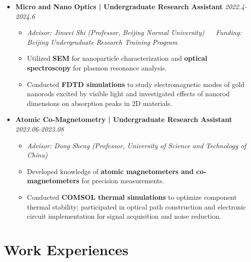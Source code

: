 \documentclass[10pt, a4paper]{article}
\begin{document}
\begin{itemize}[leftmargin=*, label={}]
    \item
    \textbf{Micro and Nano Optics | Undergraduate Research Assistant} \hfill \textit{2022.4-2024.6}
    \begin{itemize}[leftmargin=1.5em]
        \item \textit{Advisor: Jinwei Shi (Professor, Beijing Normal University)} $\quad$ \textit{Funding: Beijing Undergraduate Research Training Program}
        \item Utilized \textbf{SEM} for nanoparticle characterization and \textbf{optical spectroscopy} for plasmon resonance analysis.
        \item Conducted \textbf{FDTD simulations} to study electromagnetic modes of gold nanorods excited by visible light and investigated effects of nanorod dimensions on absorption peaks in 2D materials.
    \end{itemize}
    \vspace{0.2em}

    \item
    \textbf{Atomic Co-Magnetometry | Undergraduate Research Assistant} \hfill \textit{2023.06-2023.08}
    \begin{itemize}[leftmargin=1.5em]
        \item \textit{Advisor: Dong Sheng (Professor, University of Science and Technology of China)}
        \item Developed knowledge of \textbf{atomic magnetometers and co-magnetometers} for precision measurements.
        \item Conducted \textbf{COMSOL thermal simulations} to optimize component thermal stability; participated in optical path construction and electronic circuit implementation for signal acquisition and noise reduction.
    \end{itemize}

\end{itemize}


\section{Work Experiences}
\end{document}
